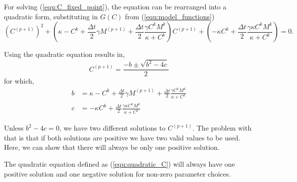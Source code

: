For solving (\ref{equ:C_fixed_point}), the equation can be rearranged into a quadratic form, substituting in $G(C)$ from (\ref{equ:model_functions})
\begin{equation} \label{equ:quadratic_C}
  \left(C^{(p+1)}\right)^2 + \left( \kappa - C^k + \frac{\Delta t}{2} \gamma M^{(p+1)} + \frac{\Delta t}{2} \frac{ \gamma C^k M^k}{\kappa + C^k} \right) C^{(p+1)} + \left( -\kappa C^k + \frac{\Delta t}{2} \frac{\gamma \kappa C^k M^k}{\kappa + C^k} \right) = 0.
\end{equation}

Using the quadratic equation results in, 
  \begin{equation} \label{eq:Cquad}
    C^{(p+1)} = \frac{-b \pm \sqrt{b^2 - 4c}}{2}
  \end{equation}  
  for which, 
  \begin{equation} \begin{aligned} \label{para:abc}
    b &= \kappa - C^k + \frac{\Delta t}{2} \gamma M^{(p+1)} + \frac{\Delta t}{2} \frac{\gamma C^k M^k}{\kappa + C^k} \\
    c &= -\kappa C^k + \frac{\Delta t}{2} \frac{\gamma \kappa C^k M^k}{\kappa + C^k}
  \end{aligned}  \end{equation}

Unless $b^2 - 4c = 0$, we have two different solutions to $C^{(p+1)}$. 
The problem with that is that if both solutions are positive we have two valid values to be used. 
Here, we can show that there will always be only one positive solution.

\begin{prop}
  The quadratic equation defined as (\ref{equ:quadratic_C}) will always have one positive solution and one negative solution for non-zero parameter choices.
\end{prop}

